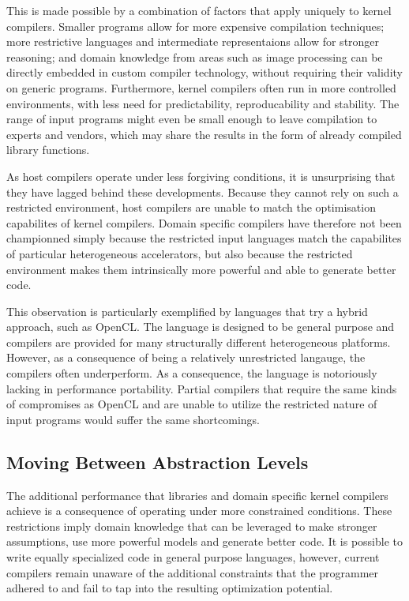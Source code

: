     This is made possible by a combination of factors that apply uniquely to
    kernel compilers.
    Smaller programs allow for more expensive compilation techniques;
    more restrictive languages and intermediate representaions allow for
    stronger reasoning;
    and domain knowledge from areas such as image processing can be directly
    embedded in custom compiler technology, without requiring their validity
    on generic programs.
    Furthermore, kernel compilers often run in more controlled environments,
    with less need for predictability, reproducability and stability.
    The range of input programs might even be small enough to leave compilation
    to experts and vendors, which may share the results in the form of already
    compiled library functions.

    As host compilers operate under less forgiving conditions, it is
    unsurprising that they have lagged behind these developments.
    Because they cannot rely on such a restricted environment, host compilers
    are unable to match the optimisation capabilites of kernel compilers.
    Domain specific compilers have therefore not been championned simply because
    the restricted input languages match the capabilites of particular
    heterogeneous accelerators, but also because the restricted environment
    makes them intrinsically more powerful and able to generate better code.

    This observation is particularly exemplified by languages that try a hybrid
    approach, such as OpenCL.
    The language is designed to be general purpose and compilers are provided
    for many structurally different heterogeneous platforms.
    However, as a consequence of being a relatively unrestricted langauge, the
    compilers often underperform.
    As a consequence, the language is notoriously lacking in performance
    portability.
    Partial compilers that require the same kinds of compromises as OpenCL and
    are unable to utilize the restricted nature of input programs would suffer
    the same shortcomings.

\subsection*{Moving Between Abstraction Levels}

    The additional performance that libraries and domain specific kernel
    compilers achieve is a consequence of operating under more constrained
    conditions.
    These restrictions imply domain knowledge that can be leveraged to make
    stronger assumptions, use more powerful models and generate better code.
    It is possible to write equally specialized code in general purpose
    languages, however, current compilers remain unaware of the additional
    constraints that the programmer adhered to and fail to tap into the
    resulting optimization potential.

